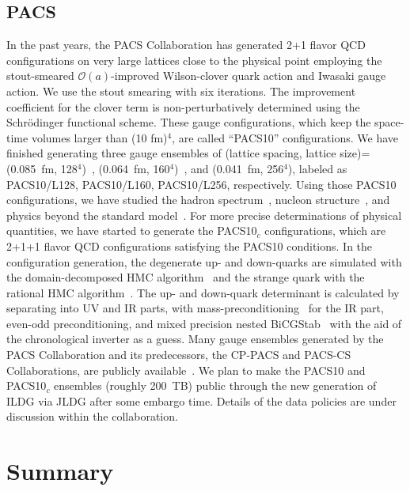 \documentclass[a4paper,11pt]{article}
\begin{document}
\subsection{PACS}
In the past years, the PACS Collaboration has generated 2+1 flavor QCD
configurations on very large lattices close to the physical point
employing the stout-smeared $\mathcal{O}(a)$-improved Wilson-clover
quark action and Iwasaki gauge action. We use the stout smearing with
six iterations.  The improvement coefficient for the clover term is
non-perturbatively determined using the Schr\"odinger functional
scheme. These gauge configurations, which keep the space-time volumes
larger than (10 fm)$^4$, are called ``PACS10'' configurations.  We
have finished generating three gauge ensembles of (lattice spacing,
lattice size)=(0.085~fm, 128$^4$)~\cite{Ishikawa:2018jee}, (0.064~fm,
160$^4$)~\cite{Shintani:2019wai}, and (0.041~fm, 256$^4$), labeled as
PACS10/L128, PACS10/L160, PACS10/L256, respectively.  Using those
PACS10 configurations, we have studied the hadron
spectrum~\cite{Ishikawa:2018jee,PACS:2019ofv}, nucleon
structure~\cite{Shintani:2018ozy,Tsuji:2022ric,Tsuji:2023llh,Tsuji:2023qcr},
and physics beyond the standard
model~\cite{Shintani:2019wai,PACS:2019hxd,Ishikawa:2022ulx,Yamazaki:2023swq}.
For more precise determinations of physical quantities, we have
started to generate the PACS10$_c$ configurations, which are 2+1+1
flavor QCD configurations satisfying the PACS10 conditions.  In the
configuration generation, the degenerate up- and down-quarks are
simulated with the domain-decomposed HMC
algorithm~\cite{Luscher:2003vf} and the strange quark with the
rational HMC algorithm~\cite{Clark:2006fx}.  The up- and down-quark
determinant is calculated by separating into UV and IR parts, with
mass-preconditioning~\cite{Hasenbusch:2001ne} for the IR part,
even-odd preconditioning, and mixed precision nested
BiCGStab~\cite{PACS-CS:2008bkb} with the aid of the chronological
inverter as a guess.  Many gauge ensembles generated by the PACS
Collaboration and its predecessors, the CP-PACS and PACS-CS
Collaborations, are publicly available~\cite{JLDG}.  We plan to make
the PACS10 and PACS10$_c$ ensembles (roughly 200~TB) public through
the new generation of ILDG via JLDG after some embargo time.  Details
of the data policies are under discussion within the collaboration.

\section{Summary}
\end{document}
